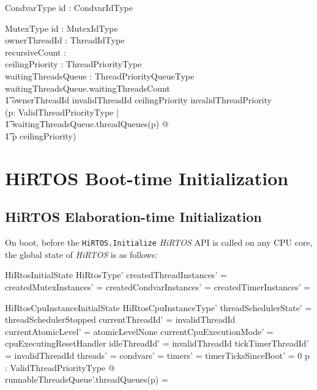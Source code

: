 \documentclass[11pt,letterpaper,twoside,openany]{book}
\begin{document}
\begin{schema}{CondvarType}
   id : CondvarIdType
\end{schema}

\begin{schema}{MutexType}
   id : MutexIdType \\
   ownerThreadId : ThreadIdType \\
   recursiveCount : \nat \\
   ceilingPriority : ThreadPriorityType \\
   waitingThreadsQueue : ThreadPriorityQueueType
\where
   waitingThreadsQueue.waitingThreadsCount  \implies \\
   \t1 ownerThreadId \neq invalidThreadId
\also
   ceilingPriority \neq invalidThreadPriority \implies \\
   (\forall p: ValidThreadPriorityType | \\
   \t1     waitingThreadsQueue.threadQueues(p) \neq \emptyset @ \\
   \t1     p \leq ceilingPriority)
\end{schema}

\section{HiRTOS Boot-time Initialization}

\subsection{HiRTOS Elaboration-time Initialization}

On boot, before the \verb`HiRTOS.Initialize` \emph{HiRTOS} API is called on any CPU core,
the global state of \emph{HiRTOS} is as follows:

\begin{schema}{HiRtosInitialState}
    HiRtosType'
\where
    createdThreadInstances' =  \emptyset
\also
    createdMutexInstances' = \emptyset
\also
    createdCondvarInstances' = \emptyset
\also
    createdTimerInstances' = \emptyset
\end{schema}

\begin{schema}{HiRtosCpuInstanceInitialState}
    HiRtosCpuInstanceType'
\where
    threadSchedulerState' = threadSchedulerStopped
\also
    currentThreadId' = invalidThreadId
\also
    currentAtomicLevel' = atomicLevelNone
\also
    currentCpuExecutionMode' = cpuExecutingResetHandler
\also
    idleThreadId' = invalidThreadId
\also
    tickTimerThreadId' = invalidThreadId
\also
    threads' = \emptyset
\also
    condvars' = \emptyset
\also
    timers' = \emptyset
\also
    timerTicksSinceBoot' = 0
\also
    \forall p : ValidThreadPriorityType @ \\
	runnableThreadsQueue'.threadQueues(p) = \emptyset
\end{schema}
\end{document}
